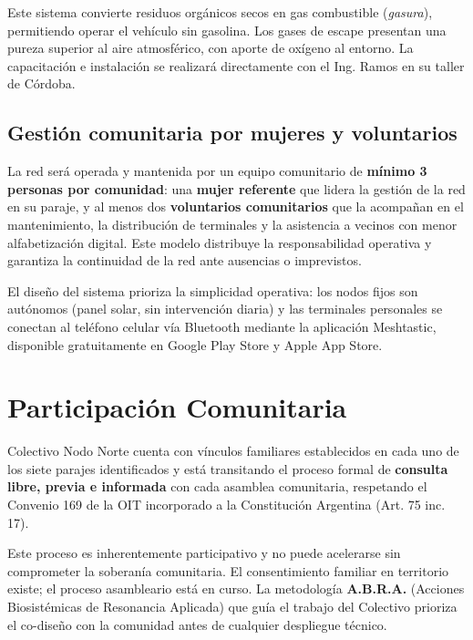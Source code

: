 \documentclass[12pt,a4paper]{article}
\begin{document}
Este sistema convierte residuos orgánicos secos en gas combustible (\textit{gasura}), permitiendo operar el vehículo sin gasolina. Los gases de escape presentan una pureza superior al aire atmosférico, con aporte de oxígeno al entorno. La capacitación e instalación se realizará directamente con el Ing. Ramos en su taller de Córdoba.

\subsection{Gestión comunitaria por mujeres y voluntarios}

La red será operada y mantenida por un equipo comunitario de \textbf{mínimo 3 personas por comunidad}: una \textbf{mujer referente} que lidera la gestión de la red en su paraje, y al menos dos \textbf{voluntarios comunitarios} que la acompañan en el mantenimiento, la distribución de terminales y la asistencia a vecinos con menor alfabetización digital. Este modelo distribuye la responsabilidad operativa y garantiza la continuidad de la red ante ausencias o imprevistos.

El diseño del sistema prioriza la simplicidad operativa: los nodos fijos son autónomos (panel solar, sin intervención diaria) y las terminales personales se conectan al teléfono celular vía Bluetooth mediante la aplicación Meshtastic, disponible gratuitamente en Google Play Store y Apple App Store.

\section{Participación Comunitaria}

Colectivo Nodo Norte cuenta con vínculos familiares establecidos en cada uno de los siete parajes identificados y está transitando el proceso formal de \textbf{consulta libre, previa e informada} con cada asamblea comunitaria, respetando el Convenio 169 de la OIT incorporado a la Constitución Argentina (Art. 75 inc. 17).

Este proceso es inherentemente participativo y no puede acelerarse sin comprometer la soberanía comunitaria. El consentimiento familiar en territorio existe; el proceso asambleario está en curso. La metodología \textbf{A.B.R.A.} (Acciones Biosistémicas de Resonancia Aplicada) que guía el trabajo del Colectivo prioriza el co-diseño con la comunidad antes de cualquier despliegue técnico.
\end{document}
